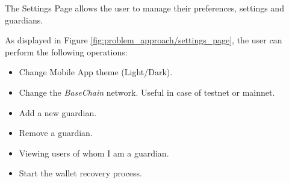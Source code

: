 The Settings Page allows the user to manage their preferences, settings and guardians. 

As displayed in Figure \ref{fig:problem_approach/settings_page}, the user can perform the following operations:
\begin{itemize}
    \item Change Mobile App theme (Light/Dark).
    \item Change the \textit{BaseChain} network. Useful in case of testnet or mainnet.
    \item Add a new guardian.
    \item Remove a guardian.
    \item Viewing users of whom I am a guardian.
    \item Start the wallet recovery process.
\end{itemize}

